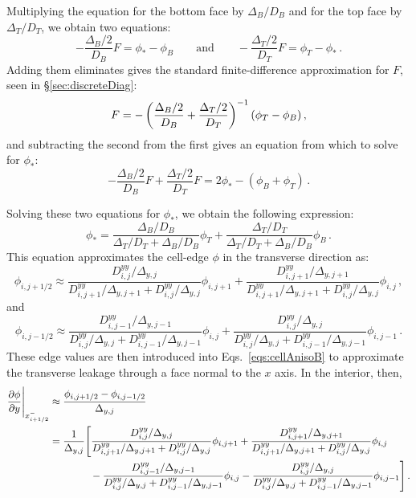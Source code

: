 Multiplying the equation for the bottom face by $\Delta_B / D_B$ and for the top
face by
$\Delta_T / D_T$, we obtain two equations:
\begin{equation*}
  -\frac{\Delta_B/2}{D_B } F = \phi_* - \phi_B
  \qquad\text{and}\qquad
  -\frac{\Delta_T/2}{D_T } F = \phi_T - \phi_* \,.
\end{equation*}
Adding them eliminates gives the standard finite-difference approximation for
$F$, seen in \S\ref{sec:discreteDiag}:
\begin{equation*}
  F = - \left( \frac{\Delta_B/2}{D_B } + \frac{\Delta_T/2}{D_T } \right)^{-1}
  \left( \phi_T - \phi_B \right),
\end{equation*}
and subtracting the second from the first gives an equation from which to solve
for $\phi_*$:
\begin{equation*}
 -\frac{\Delta_B/2}{D_B }F + \frac{\Delta_T/2}{D_T } F
 = 2 \phi_*-(\phi_B+\phi_T)\,.
\end{equation*}

Solving these two equations for $\phi_*$, we obtain the following expression:
\begin{equation}\label{eq:cellAnisoEdge}
  \phi_* = \frac{\Delta_B/D_B}{\Delta_T/D_T + \Delta_B/D_B} \phi_T
+ \frac{\Delta_T/D_T}{\Delta_T/D_T + \Delta_B/D_B} \phi_B \,.
\end{equation}
This equation approximates the cell-edge $\phi$ in the transverse direction as:
\begin{equation*}
  \phi_{i,j+1/2} \approx
  \frac{D_{i,j}^{yy} / \Delta_{y,j}}{D_{i,j+1}^{yy} / \Delta_{y,j+1} +
  D_{i,j}^{yy} / \Delta_{y,j}} \phi_{i,j+1}
+ \frac{D_{i,j+1}^{yy} / \Delta_{y,j+1}}{D_{i,j+1}^{yy} / \Delta_{y,j+1} +
D_{i,j}^{yy} / \Delta_{y,j}} \phi_{i,j} \,,
\end{equation*}
and
\begin{equation*}
  \phi_{i,j-1/2} \approx
  \frac{D_{i,j-1}^{yy} / \Delta_{y,j-1}}{D_{i,j}^{yy} / \Delta_{y,j} +
  D_{i,j-1}^{yy} / \Delta_{y,j-1}} \phi_{i,j}
+ \frac{D_{i,j}^{yy} / \Delta_{y,j}}{D_{i,j}^{yy} / \Delta_{y,j} +
D_{i,j-1}^{yy} / \Delta_{y,j-1}} \phi_{i,j-1} \,.
\end{equation*}
These edge values are then introduced into Eqs.~\eqref{eqs:cellAnisoB} to
approximate the transverse leakage through a face normal to the $x$ axis. In
the interior, then,
\begin{align*}
  \frac{\partial \phi}{\partial y} \Bigg|_{x_{i+1/2}^-} & \approx
  \frac{\phi_{i,j+1/2} - \phi_{i,j-1/2}}{\Delta_{y,j}}
  \\
  &= \frac{1}{\Delta_{y,j}} \Bigg[
  \frac{D_{i,j}^{yy} / \Delta_{y,j}}{D_{i,j+1}^{yy} / \Delta_{y,j+1} +
  D_{i,j}^{yy} / \Delta_{y,j}} \phi_{i,j+1}
+ \frac{D_{i,j+1}^{yy} / \Delta_{y,j+1}}{D_{i,j+1}^{yy} / \Delta_{y,j+1} +
D_{i,j}^{yy} / \Delta_{y,j}} \phi_{i,j}
\\
&\qquad\qquad -
  \frac{D_{i,j-1}^{yy} / \Delta_{y,j-1}}{D_{i,j}^{yy} / \Delta_{y,j} +
  D_{i,j-1}^{yy} / \Delta_{y,j-1}} \phi_{i,j}
- \frac{D_{i,j}^{yy} / \Delta_{y,j}}{D_{i,j}^{yy} / \Delta_{y,j} +
D_{i,j-1}^{yy} / \Delta_{y,j-1}} \phi_{i,j-1}
    \Bigg] \,.
\end{align*}



